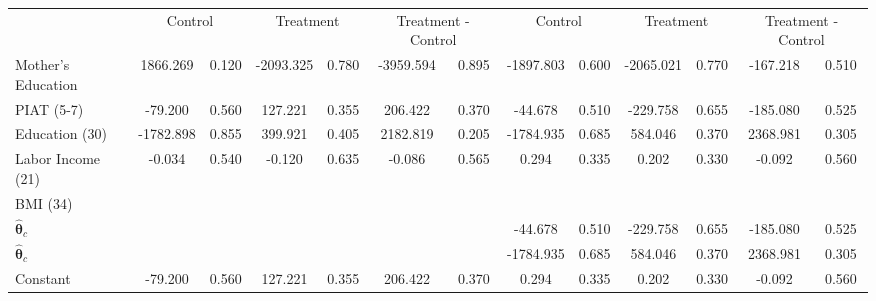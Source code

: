 \begin{tabular}{lcccccccccccc} \toprule
&\multicolumn{2}{c}{Control} & \multicolumn{2}{c}{Treatment} & \multicolumn{2}{c}{Treatment - Control} & \multicolumn{2}{c}{Control} & \multicolumn{2}{c}{Treatment} & \multicolumn{2}{c}{Treatment - Control} \\
Mother's Education &  1866.269 &     0.120 & -2093.325 &     0.780 & -3959.594 &     0.895 & -1897.803 &     0.600 & -2065.021 &     0.770 &  -167.218 &     0.510 \\  
PIAT (5-7) &   -79.200 &     0.560 &   127.221 &     0.355 &   206.422 &     0.370 &   -44.678 &     0.510 &  -229.758 &     0.655 &  -185.080 &     0.525 \\  
Education (30) & -1782.898 &     0.855 &   399.921 &     0.405 &  2182.819 &     0.205 & -1784.935 &     0.685 &   584.046 &     0.370 &  2368.981 &     0.305 \\  
Labor Income (21) &    -0.034 &     0.540 &    -0.120 &     0.635 &    -0.086 &     0.565 &     0.294 &     0.335 &     0.202 &     0.330 &    -0.092 &     0.560 \\  
BMI (34)  &         &         &         &         &         &         &         &         &         &         &         &          \\  
$\hat{\bm{\theta}}_c$ &         &         &         &         &         &         &   -44.678 &     0.510 &  -229.758 &     0.655 &  -185.080 &     0.525 \\  
$\hat{\bm{\theta}}_c$ &         &         &         &         &         &         & -1784.935 &     0.685 &   584.046 &     0.370 &  2368.981 &     0.305 \\  
Constant &   -79.200 &     0.560 &   127.221 &     0.355 &   206.422 &     0.370 &     0.294 &     0.335 &     0.202 &     0.330 &    -0.092 &     0.560 \\  
\bottomrule \end{tabular}
